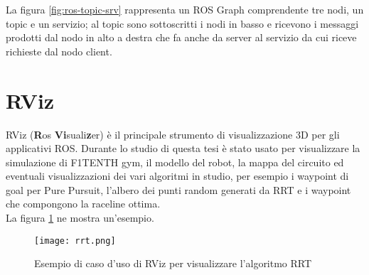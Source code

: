 La figura \ref{fig:ros-topic-srv} rappresenta un ROS Graph comprendente tre nodi, un topic e un servizio;
al topic sono sottoscritti i nodi in basso e ricevono i messaggi prodotti dal nodo in alto a destra che
fa anche da server al servizio da cui riceve richieste dal nodo client.

\section{RViz}
\label{sec:rviz}
RViz (\textbf{R}os \textbf{Vi}suali\textbf{z}er) è il principale strumento di visualizzazione 3D per gli
applicativi ROS. Durante lo studio di questa tesi è stato usato per visualizzare la simulazione di
F1TENTH gym, il modello del robot, la mappa del circuito ed eventuali visualizzazioni dei vari algoritmi
in studio, per esempio i waypoint di goal per Pure Pursuit, l'albero dei punti random generati da RRT e i
waypoint che compongono la raceline ottima.\\
La figura \ref{fig:rviz-example} ne mostra un'esempio.

\begin{figure}[H]
	\centering
	\texttt{[image: rrt.png]}
	\caption{Esempio di caso d'uso di RViz per visualizzare l'algoritmo RRT}
	\label{fig:rviz-example}
\end{figure}
